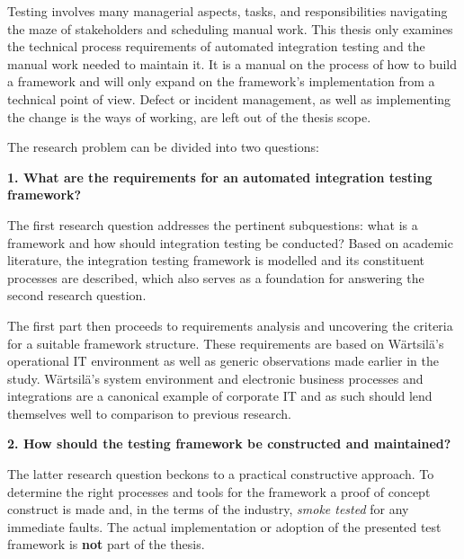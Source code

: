 \documentclass[12pt,a4paper,oneside,pdftex]{report}
\begin{document}
Testing involves many managerial aspects, tasks, and responsibilities navigating the maze of stakeholders and scheduling manual work. This thesis only examines the technical process requirements of automated integration testing and the manual work needed to maintain it. It is a manual on the process of how to build a framework and will only expand on the framework's implementation from a technical point of view. Defect or incident management, as well as implementing the change is the ways of working, are left out of the thesis scope.

The research problem can be divided into two questions: \\

\begin{adjustwidth}{2.5em}{0pt}
\textbf{1. What are the requirements for an automated integration testing framework?} \\
\end{adjustwidth}

The first research question addresses the pertinent subquestions: what is a framework and how should integration testing be conducted? Based on academic literature, the integration testing framework is modelled and its constituent processes are described, which also serves as a foundation for answering the second research question.

The first part then proceeds to requirements analysis and uncovering the criteria for a suitable framework structure. These requirements are based on Wärtsilä's operational IT environment as well as generic observations made earlier in the study. Wärtsilä's system environment and electronic business processes and integrations are a canonical example of corporate IT and as such should lend themselves well to comparison to previous research. \\


\begin{adjustwidth}{2.5em}{0pt}
\textbf{2. How should the testing framework be constructed and maintained?} \\
\end{adjustwidth}

The latter research question beckons to a practical constructive approach. To determine the right processes and tools for the framework a proof of concept construct is made and, in the terms of the industry, \emph{smoke tested} for any immediate faults. The actual implementation or adoption of the presented test framework is \textbf{not} part of the thesis.
\end{document}
